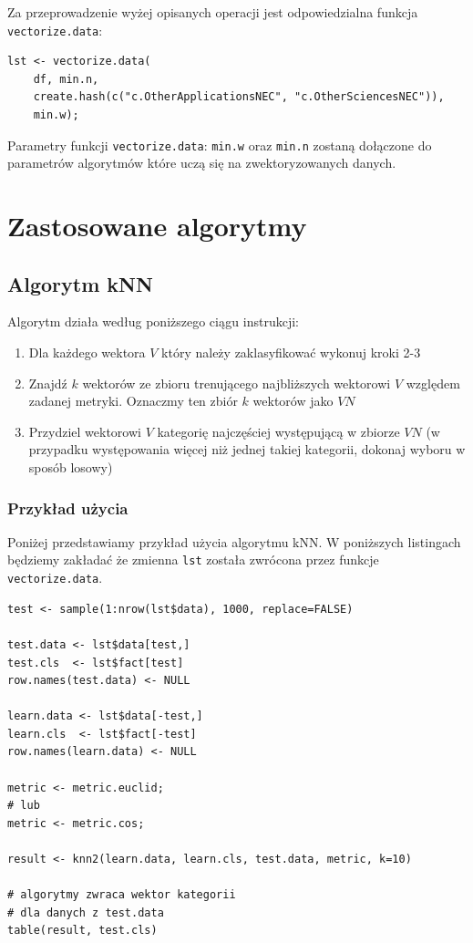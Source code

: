 \documentclass[a4paper,12pt]{article}
\begin{document}
		Za przeprowadzenie wyżej opisanych operacji jest
		odpowiedzialna funkcja \texttt{vectorize.data}:
		\begin{verbatim}
lst <- vectorize.data(
    df, min.n, 
    create.hash(c("c.OtherApplicationsNEC", "c.OtherSciencesNEC")),
    min.w);
		\end{verbatim}
		
		Parametry funkcji \texttt{vectorize.data}: \texttt{min.w} oraz
		\texttt{min.n} zostaną dołączone do parametrów algorytmów
		które uczą się na zwektoryzowanych danych.

\section{Zastosowane algorytmy}
	\subsection{Algorytm kNN}
		
		Algorytm działa według poniższego ciągu instrukcji:
		\begin{enumerate}
			\item
				Dla każdego wektora $V$ który należy zaklasyfikować
				wykonuj kroki 2-3
			\item
				Znajdź $k$ wektorów ze zbioru trenującego najbliższych 
				wektorowi $V$ względem zadanej
				metryki. Oznaczmy ten zbiór $k$ wektorów jako $VN$
			\item
				Przydziel wektorowi $V$ kategorię najczęściej występującą 
				w zbiorze $VN$ (w przypadku występowania więcej niż jednej
				takiej kategorii, dokonaj wyboru w sposób losowy)
		\end{enumerate}
		
		\subsubsection{Przykład użycia}
		Poniżej przedstawiamy przykład użycia algorytmu kNN.
		W poniższych listingach będziemy zakładać że zmienna \texttt{lst}
		została zwrócona przez funkcje \texttt{vectorize.data}.
		\begin{verbatim}
test <- sample(1:nrow(lst$data), 1000, replace=FALSE)

test.data <- lst$data[test,]
test.cls  <- lst$fact[test]
row.names(test.data) <- NULL

learn.data <- lst$data[-test,]
learn.cls  <- lst$fact[-test]
row.names(learn.data) <- NULL

metric <- metric.euclid;
# lub
metric <- metric.cos;

result <- knn2(learn.data, learn.cls, test.data, metric, k=10)

# algorytmy zwraca wektor kategorii
# dla danych z test.data
table(result, test.cls)
		\end{verbatim}
		
\end{document}
